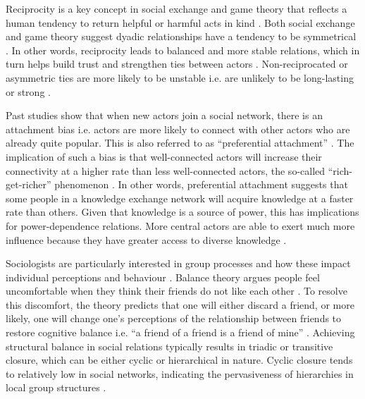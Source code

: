 Reciprocity is a key concept in social exchange and game theory that reflects a human tendency to return helpful or harmful acts in kind \citep{nowak2005evolution}. Both social exchange and game theory suggest dyadic relationships have a tendency to be symmetrical \citep{emerson1976social,axelrod1984evolution}. In other words, reciprocity leads to balanced and more stable relations, which in turn helps build trust and strengthen ties between actors \citep{blau1964exchange}. Non-reciprocated or asymmetric ties are more likely to be unstable i.e. are unlikely to be long-lasting or strong \citep{snijders2011statistical}. \medskip %

Past studies show that when new actors join a social network, there is an attachment bias i.e. actors are more likely to connect with other actors who are already quite popular. This is also referred to as \enquote{preferential attachment} \citep{barabasi1999emergence}. The implication of such a bias is that well-connected actors will increase their connectivity at a higher rate than less well-connected actors, the so-called \enquote{rich-get-richer} phenomenon \citep{desollaprice976general}. In other words, preferential attachment suggests that some people in a knowledge exchange network will acquire knowledge at a faster rate than others. Given that knowledge is a source of power, this has implications for power-dependence relations. More central actors are able to exert much more influence because they have greater access to diverse knowledge \citep{emerson1962power,bonacich1987power}. \medksip 

Sociologists are particularly interested in group processes and how these impact individual perceptions and behaviour \citep{de2011exploratory}. Balance theory argues people feel uncomfortable when they think their friends do not like each other \citep{heider1958psychology}. To resolve this discomfort, the theory predicts that one will either discard a friend, or more likely, one will change one’s perceptions of the relationship between friends to restore cognitive balance i.e. \enquote{a friend of a friend is a friend of mine} \citep{krackhardt1987cognitive}. Achieving structural balance in social relations typically results in triadic or transitive closure, which can be either cyclic or hierarchical in nature. Cyclic closure tends to relatively low in social networks, indicating the pervasiveness of hierarchies in local group structures \citep{davis1967structure}. \medskip  

